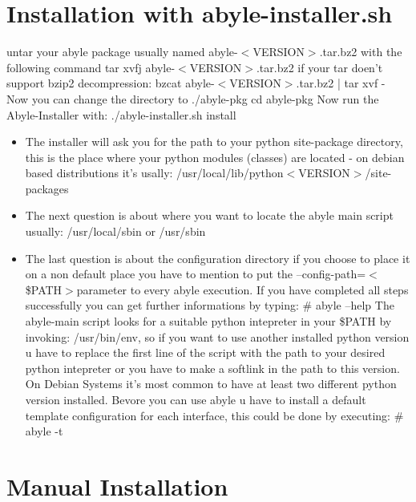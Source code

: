 \section{Installation with abyle-installer.sh}
untar your abyle package usually named abyle-$<$VERSION$>$.tar.bz2 with the following command\dnl
\courierfont
tar xvfj abyle-$<$VERSION$>$.tar.bz2\dnl
\normalfont
if your tar doen't support bzip2 decompression:\dnl
\courierfont
bzcat abyle-$<$VERSION$>$.tar.bz2 | tar xvf -\dnl
\normalfont
Now you can change the directory to ./abyle-pkg\dnl
\courierfont
cd abyle-pkg\dnl
\normalfont
Now run the Abyle-Installer with:\dnl
\courierfont
./abyle-installer.sh install\dnl
\normalfont
\begin{itemize}
\item The installer will ask you for the path to your python site-package directory, this is the place where your python modules (classes) are located - on debian based distributions it's usally:\dnl
\courierfont
/usr/local/lib/python$<$VERSION$>$/site-packages\dnl
\normalfont
\item The next question is about where you want to locate the abyle main script usually:\dnl 
\courierfont
/usr/local/sbin\dnl
\normalfont
or\dnl
\courierfont
/usr/sbin\dnl
\normalfont
\item The last question is about the configuration directory if you choose to place it on a non default place you have to mention to put the \courierfont--config-path=$<$\$PATH$>$\normalfont parameter to every abyle execution.
If you have completed all steps successfully you can get further informations by typing:\dnl
\courierfont
\# abyle --help\dnl
\normalfont
The abyle-main script looks for a suitable python intepreter in your \$PATH by invoking: /usr/bin/env, so if you want to use another installed python version u have to replace the first line of the script with the path to your desired python intepreter or you have to make a softlink in the path to this version. On Debian Systems it's most common to have at least two different python version installed.\newline
Bevore you can use abyle u have to install a default template configuration for each interface,
this could be done by executing:\dnl
\courierfont
\# abyle -t\dnl
\normalfont
\end{itemize}

\section{Manual Installation}



